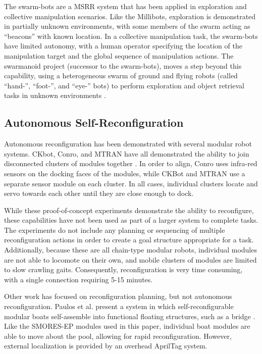 \documentclass[conference]{IEEEtran}
\begin{document}
The swarm-bots are a MSRR system that has been applied in exploration \cite{Dorigo2005} and collective manipulation \cite{Mondada2005} scenarios.  Like the Millibots, exploration is demonstrated in partially unknown environments, with some members of the swarm acting as ``beacons'' with known location.  In a collective manipulation task, the swarm-bots have limited autonomy, with a human operator specifying the location of the manipulation target and the global sequence of manipulation actions. The swarmanoid project (successor to the swarm-bots), moves a step beyond this capability, using a heterogeneous swarm of ground and flying robots (called ``hand-'', ``foot-'', and ``eye-'' bots) to perform exploration and object retrieval tasks in unknown environments \cite{Dorigo2013}. 
%
\subsection{Autonomous Self-Reconfiguration}
\label{autonomous-self-reconfiguration}
%
Autonomous reconfiguration has been demonstrated with several modular robot systems. CKbot, Conro, and MTRAN have all demonstrated the ability to join disconnected clusters of modules together \cite{Yim2007, Rubenstein2004,Murata2006}. In order to align, Conro uses infra-red sensors on the docking faces of the modules, while CKBot and MTRAN use a separate sensor module on each cluster.  In all cases, individual clusters locate and servo towards each other until they are close enough to dock.

While these proof-of-concept experiments demonstrate the ability to reconfigure, these capabilities have not been used as part of a larger system to complete tasks. The experiments do not include any planning or sequencing of multiple reconfiguration actions in order to create a goal structure appropriate for a task.  Additionally, because these are all chain-type modular robots, individual modules are not able to locomote on their own, and mobile clusters of modules are limited to slow crawling gaits.  Consequently, reconfiguration is very time consuming, with a single connection requiring 5-15 minutes.

Other work has focused on reconfiguration planning, but not autonomous reconfiguration.  Paulos et al. present a system in which self-reconfigurable modular boats self-assemble into functional floating structures, such as a bridge \cite{Paulos2015}.  Like the SMORES-EP modules used in this paper, individual boat modules are able to move about the pool, allowing for rapid reconfiguration.  However, external localization is provided by an overhead AprilTag system. 
\end{document}
